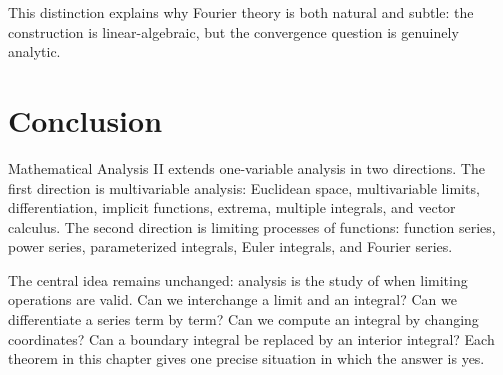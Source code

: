This distinction explains why Fourier theory is both natural and subtle: the construction is linear-algebraic, but the convergence question is genuinely analytic.

\section{Conclusion}

Mathematical Analysis II extends one-variable analysis in two directions. The first direction is multivariable analysis: Euclidean space, multivariable limits, differentiation, implicit functions, extrema, multiple integrals, and vector calculus. The second direction is limiting processes of functions: function series, power series, parameterized integrals, Euler integrals, and Fourier series.

The central idea remains unchanged: analysis is the study of when limiting operations are valid. Can we interchange a limit and an integral? Can we differentiate a series term by term? Can we compute an integral by changing coordinates? Can a boundary integral be replaced by an interior integral? Each theorem in this chapter gives one precise situation in which the answer is yes.
